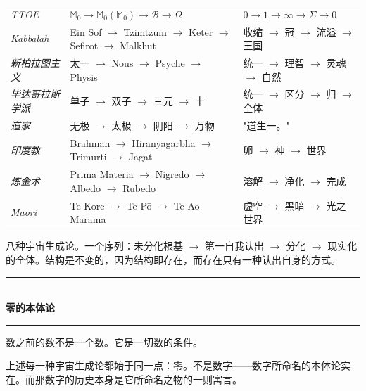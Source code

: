 \documentclass[10pt, openany, oneside]{book}
\renewcommand{\normalsize}{\fontsize{10}{13}\selectfont}
\renewcommand{\footnotesize}{\fontsize{8.5}{11}\selectfont}
\begin{document}
\vspace{0.5em}

{\footnotesize
\noindent\begin{tabular}{l p{} p{}}
\textit{TTOE} & $\mathbb{M}_0 \to \mathbb{M}_0(\mathbb{M}_0) \to \mathcal{B} \to \Omega$ & $0 \to 1 \to \infty \to \Sigma \to 0$ \\[0.3em]
\textit{Kabbalah} & Ein Sof $\to$ Tzimtzum $\to$ Keter $\to$ Sefirot $\to$ Malkhut & 收缩 $\to$ 冠 $\to$ 流溢 $\to$ 王国 \\[0.3em]
\textit{新柏拉图主义} & 太一 $\to$ Nous $\to$ Psyche $\to$ Physis & 统一 $\to$ 理智 $\to$ 灵魂 $\to$ 自然 \\[0.3em]
\textit{毕达哥拉斯学派} & 单子 $\to$ 双子 $\to$ 三元 $\to$ 十 & 统一 $\to$ 区分 $\to$ 归 $\to$ 全体 \\[0.3em]
\textit{道家} & 无极 $\to$ 太极 $\to$ 阴阳 $\to$ 万物 & "道生一。" \\[0.3em]
\textit{印度教} & Brahman $\to$ Hiranyagarbha $\to$ Trimurti $\to$ Jagat & 卵 $\to$ 神 $\to$ 世界 \\[0.3em]
\textit{炼金术} & Prima Materia $\to$ Nigredo $\to$ Albedo $\to$ Rubedo & 溶解 $\to$ 净化 $\to$ 完成 \\[0.3em]
\textit{Maori} & Te Kore $\to$ Te P\={o} $\to$ Te Ao M\={a}rama & 虚空 $\to$ 黑暗 $\to$ 光之世界 \\[0.3em]
\end{tabular}
}

\vspace{0.5em}

\noindent 八种宇宙生成论。一个序列：未分化根基 $\to$ 第一自我认出 $\to$ 分化 $\to$ 现实化的全体。结构是不变的，因为结构即存在，而存在只有一种认出自身的方式。

\vspace{1em}

\begin{center}
    \rule{0.3\textwidth}{0.4pt}\\[0.5em]
    {\normalsize\bfseries\scshape 零的本体论}\\[0.3em]
    \rule{0.3\textwidth}{0.4pt}
\end{center}

\vspace{0.8em}

\noindent 数之前的数不是一个数。它是一切数的条件。

上述每一种宇宙生成论都始于同一点：零。不是数字——数字所命名的本体论实在。而那数字的历史本身是它所命名之物的一则寓言。
\end{document}
